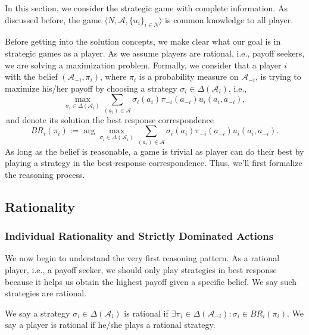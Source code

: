In this section, we consider the strategic game with complete information. As discussed before, the game $\langle N,\mathcal{A}, \{u_i\}_{i\in N} \rangle $ is common knowledge to all player.

Before getting into the solution concepts, we make clear what our goal is in strategic games as a player. As we assume players are rational, i.e., payoff seekers, we are solving a maximization problem. 
Formally, we consider that a player $i$ with the belief $(\mathcal{A}_{-i},\pi_i)$, where $\pi_i$ is a probability measure on $\mathcal{A}_{-i}$, is trying to maximize his/her payoff by choosing a strategy $\sigma_i\in \Delta(\mathcal{A}_i)$, i.e., 
\begin{equation}\label{equ: strategic_gameUMP}
    \max_{\sigma_i\in \Delta(\mathcal{A}_i)} \sum_{(a_i)\in\mathcal{A}}\sigma_i (a_i) \pi_{-i} (a_{-i})u_{i}(a_i,a_{-i}),
\end{equation}
\,and denote its solution the best response correspondence
\begin{equation}\label{equ: strategic_gameBR}
    BR_i(\pi_i) := \arg \max_{\sigma_i\in \Delta(\mathcal{A}_i)} \sum_{(a_i)\in\mathcal{A}}\sigma_i (a_i) \pi_{-i} (a_{-i})u_{i}(a_i,a_{-i}).
\end{equation}
As long as the belief is reasonable, a game is trivial as player can do their best by playing a strategy in the best-response correspondence. Thus, we'll first formalize the reasoning process.


\subsection{Rationality}
\subsubsection{Individual Rationality and Strictly Dominated Actions}
We now begin to understand the very first reasoning pattern. As a rational player, i.e., a payoff seeker, we should only play strategies in best response because it helps us obtain the highest payoff given a specific belief. We say such strategies are rational.
\begin{definition}[Rationality]
    We say a strategy $\sigma_i\in \Delta(\mathcal{A}_i)$ is rational if $\exists \pi_i\in\Delta(\mathcal{A}_{-i}): \sigma_i\in BR_i(\pi_i)$. We say a player is rational if he/she plays a rational strategy.
\end{definition}

